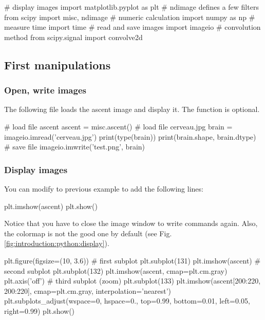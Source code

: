 \def\QRCODE{TB_image_TUT.IMG.introduction_pythonqrcode.png}
\def\QRPAGE{http://www.iptutorials.science/tree/master/TB_image/TUT.IMG.introduction/python}

\begin{python}
# display images
import matplotlib.pyplot as plt
# ndimage defines a few filters
from scipy import misc, ndimage
# numeric calculation
import numpy as np
# measure time
import time
# read and save images
import imageio
# convolution method
from scipy.signal import convolve2d
\end{python}

\vspace*{-10pt}
\subsection{First manipulations}

\subsubsection{Open, write images}
The following file loads the ascent image and display it. The  function is optional.


\begin{python}
# load file ascent
ascent = misc.ascent()
# load file cerveau.jpg
brain = imageio.imread('cerveau.jpg')
print(type(brain))
print(brain.shape, brain.dtype)
# save file
imageio.imwrite('test.png', brain)
\end{python}


\subsubsection{Display images}
You can modify to previous example to add the following lines:
\begin{python}
plt.imshow(ascent)
plt.show()
\end{python}
Notice that you have to close the image window to write commands again. Also, the colormap is not the good one by default (see Fig. \ref{fig:introduction:python:display}).

\begin{python}
plt.figure(figsize=(10, 3.6))
# first subplot
plt.subplot(131)
plt.imshow(ascent)
# second subplot
plt.subplot(132)
plt.imshow(ascent, cmap=plt.cm.gray)
plt.axis('off')
# third subplot (zoom)
plt.subplot(133)
plt.imshow(ascent[200:220, 200:220], cmap=plt.cm.gray, interpolation='nearest')
plt.subplots_adjust(wspace=0, hspace=0., 
                    top=0.99, bottom=0.01, 
                    left=0.05, right=0.99)
plt.show()
\end{python}

